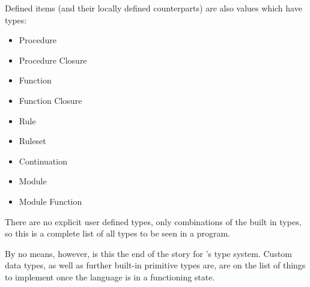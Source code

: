 \noindent
Defined items (and their locally defined counterparts) are also values which
have types:

\begin{itemize}
    \item Procedure
    \item Procedure Closure
    \item Function
    \item Function Closure
    \item Rule
    \item Ruleset
    \item Continuation
    \item Module
    \item Module Function
\end{itemize}

\noindent
There are no explicit user defined types, only combinations of the built in
types, so this is a complete list of all types to be seen in a \Trilogy{}
program.

By no means, however, is this the end of the story for \Trilogy{}'s type
system. Custom data types, as well as further built-in primitive types are,
are on the list of things to implement once the language is in a functioning
state.




